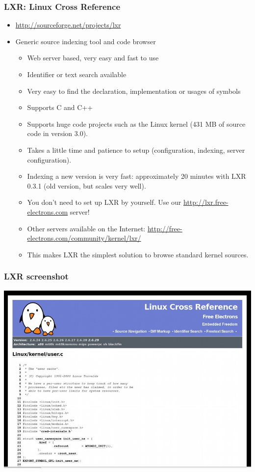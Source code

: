 \begin{frame}
  \frametitle{LXR: Linux Cross Reference}
  \begin{itemize}
  \item \url{http://sourceforge.net/projects/lxr}
  \item Generic source indexing tool and code browser
    \begin{itemize}
    \item Web server based, very easy and fast to use
    \item Identifier or text search available
    \item Very easy to find the declaration, implementation or usages
      of symbols
    \item Supports C and C++
    \item Supports huge code projects such as the Linux kernel (431 MB
      of source code in version 3.0).
    \item Takes a little time and patience to setup (configuration,
      indexing, server configuration).
    \item Indexing a new version is very fast: approximately 20
      minutes with LXR 0.3.1 (old version, but scales very well).
    \item You don't need to set up LXR by yourself. Use our
      \url{http://lxr.free-electrons.com} server!
    \item Other servers available on the Internet:
      \url{http://free-electrons.com/community/kernel/lxr/}
    \item This makes LXR the simplest solution to browse standard
      kernel sources.
    \end{itemize}
  \end{itemize}
\end{frame}

\begin{frame}
  \frametitle{LXR screenshot}
  \begin{center}
    \includegraphics[width=\textwidth]{slides/kernel-source-code-management/lxr.png}
  \end{center}
\end{frame}

